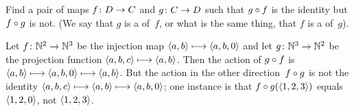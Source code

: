 \documentclass{ibl}
\begin{document}
\begin{ex}
  Find a pair of maps $\mbox{$f\colon D\to C$}$ and $\mbox{$g\colon C\to D$}$
  such that $g\mathbin{\circ} f$ is the identity but $f\mathbin{\circ} g$
  is not.
  (We say that $g$ is a  of~$f$, or what is the
  same thing, that $f$ is a  of~$g$).
\begin{ans}
Let $\mbox{$f\colon \mathbb{N}^2\to \mathbb{N}^3$}$ be the injection map
$\langle a,b\rangle\stackrel{}{\longmapsto}\langle a,b,0\rangle$
and let 
$\mbox{$g\colon \mathbb{N}^3\to \mathbb{N}^2$}$ be the projection function
$\langle a,b,c\rangle\stackrel{}{\longmapsto}\langle a,b\rangle$.
Then the action of $g\mathbin{\circ} f$ is 
$\langle a,b\rangle\stackrel{}{\longmapsto}\langle a,b,0\rangle\stackrel{}{\longmapsto}\langle a,b\rangle$.
But the action in the other direction~$f\mathbin{\circ} g$ is not the identity
$\langle a,b,c\rangle\stackrel{}{\longmapsto}\langle a,b\rangle\stackrel{}{\longmapsto}\langle a,b,0\rangle$;
one instance is that $f\mathbin{\circ} g(\langle1,2,3\rangle)$ equals
$\langle1,2,0\rangle$, not $\langle1,2,3\rangle$.     
\end{ans}
\end{ex}
\end{document}
